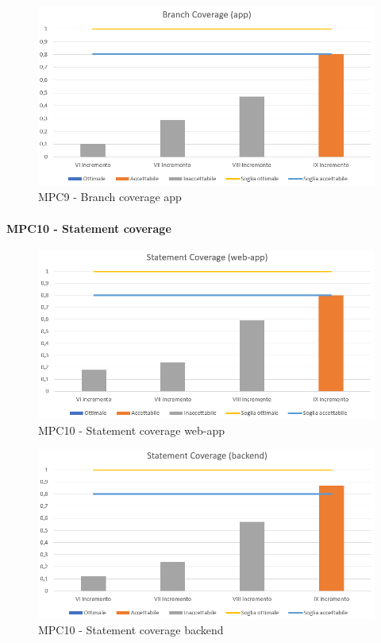   \begin{figure}[h!]
    \centering
      \includegraphics[scale=1]{Immagini/BranchCov APPA.PNG}
    \caption{MPC9 - Branch coverage app}
  \end{figure}



  \clearpage
  \paragraph{MPC10 - Statement coverage}
  \begin{figure}[h!]
    \centering
      \includegraphics[scale=1]{Immagini/StatCov WAA.PNG}
    \caption{MPC10 - Statement coverage web-app}
  \end{figure}

  \begin{figure}[h!]
    \centering
      \includegraphics[scale=1]{Immagini/StatCov BEA.PNG}
    \caption{MPC10 - Statement coverage backend}
  \end{figure}

